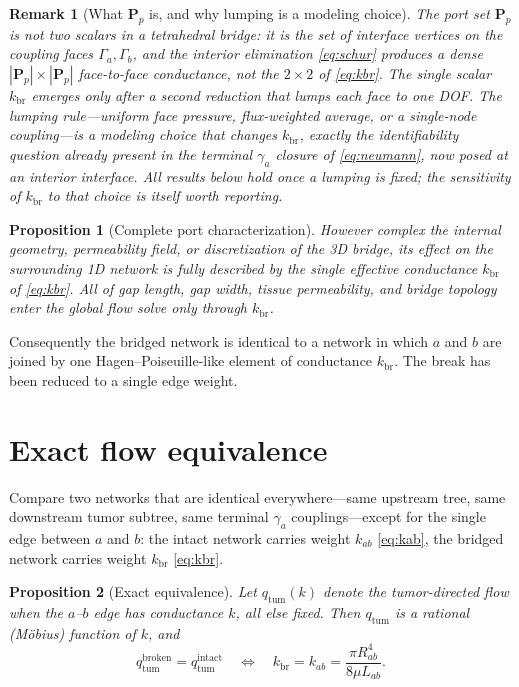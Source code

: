 \documentclass[11pt]{article}
\newtheorem{proposition}{Proposition}
\newtheorem{remark}{Remark}
\newcommand{\kbr}{k_{\mathrm{br}}}
\newcommand{\qtum}{q_{\mathrm{tum}}}
\begin{document}
\begin{remark}[What $\bm{P}_p$ is, and why lumping is a modeling choice]
\label{rem:interface}
The port set $\bm{P}_p$ is \emph{not} two scalars in a tetrahedral bridge: it is the
set of interface vertices on the coupling faces $\Gamma_a,\Gamma_b$, and the
interior elimination \eqref{eq:schur} produces a dense $|\bm{P}_p|\times|\bm{P}_p|$
face-to-face conductance, not the $2\times2$ of \eqref{eq:kbr}. The single scalar
$\kbr$ emerges only after a \emph{second} reduction that lumps each face to one DOF.
The lumping rule---uniform face pressure, flux-weighted average, or a single-node
coupling---is a modeling choice that changes $\kbr$, exactly the identifiability
question already present in the terminal $\gamma_a$ closure of \eqref{eq:neumann},
now posed at an interior interface. All results below hold once a lumping is fixed;
the sensitivity of $\kbr$ to that choice is itself worth reporting.
\end{remark}

\begin{proposition}[Complete port characterization]
\label{prop:port}
However complex the internal geometry, permeability field, or discretization of the
3D bridge, its effect on the surrounding 1D network is fully described by the single
effective conductance $\kbr$ of \eqref{eq:kbr}. All of gap length, gap width, tissue
permeability, and bridge topology enter the global flow solve \emph{only} through
$\kbr$.
\end{proposition}

\noindent
Consequently the bridged network is identical to a network in which $a$ and $b$ are
joined by one Hagen--Poiseuille-like element of conductance $\kbr$. The break has
been reduced to a single edge weight.

\section{Exact flow equivalence}
\label{sec:exact}

Compare two networks that are identical everywhere---same upstream tree, same
downstream tumor subtree, same terminal $\gamma_a$ couplings---except for the single
edge between $a$ and $b$: the intact network carries weight $k_{ab}$
\eqref{eq:kab}, the bridged network carries weight $\kbr$ \eqref{eq:kbr}.

\begin{proposition}[Exact equivalence]
\label{prop:exact}
Let $\qtum(k)$ denote the tumor-directed flow when the $a$--$b$ edge has conductance
$k$, all else fixed. Then $\qtum$ is a rational (M\"obius) function of $k$, and
\begin{equation}
\qtum^{\mathrm{broken}} = \qtum^{\mathrm{intact}}
\quad\Longleftrightarrow\quad
\kbr = k_{ab} = \frac{\pi R_{ab}^{4}}{8\mu L_{ab}}.
\label{eq:exact}
\end{equation}
\end{proposition}
\end{document}
